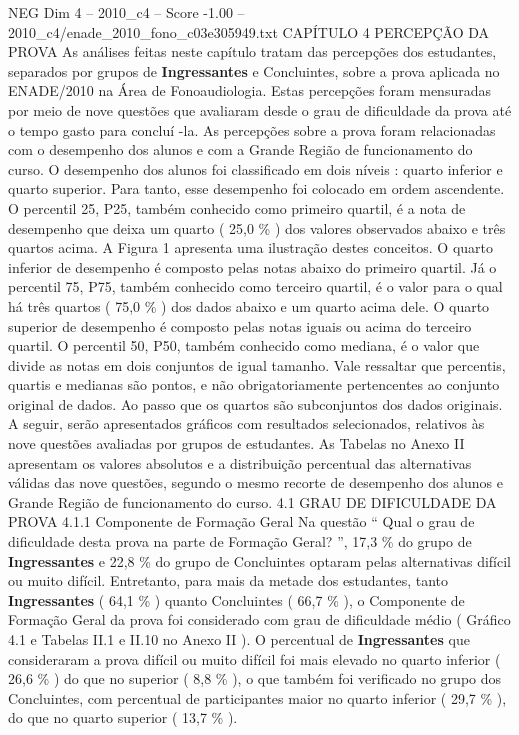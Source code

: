 \begin{textsample}{NEG Dim 4 – 2010\_c4 – Score -1.00 – 2010\_c4/enade\_2010\_fono\_c03e305949.txt}  \label{ex:f4_neg_068}
CAPÍTULO 4 PERCEPÇÃO DA PROVA As análises feitas neste capítulo tratam das percepções dos estudantes, separados por grupos de \textbf{Ingressantes} e Concluintes, sobre a prova aplicada no ENADE/2010 na Área de Fonoaudiologia.
Estas percepções foram mensuradas por meio de nove questões que avaliaram desde o grau de dificuldade da prova até o tempo gasto para concluí -la.
As percepções sobre a prova foram relacionadas com o desempenho dos alunos e com a Grande Região de funcionamento do curso.
O desempenho dos alunos foi classificado em dois níveis : quarto inferior e quarto superior.
Para tanto, esse desempenho foi colocado em ordem ascendente.
O percentil 25, P25, também conhecido como primeiro quartil, é a nota de desempenho que deixa um quarto ( 25,0 \% ) dos valores observados abaixo e três quartos acima.
A Figura 1 apresenta uma ilustração destes conceitos.
O quarto inferior de desempenho é composto pelas notas abaixo do primeiro quartil.
Já o percentil 75, P75, também conhecido como terceiro quartil, é o valor para o qual há três quartos ( 75,0 \% ) dos dados abaixo e um quarto acima dele.
O quarto superior de desempenho é composto pelas notas iguais ou acima do terceiro quartil.
O percentil 50, P50, também conhecido como mediana, é o valor que divide as notas em dois conjuntos de igual tamanho.
Vale ressaltar que percentis, quartis e medianas são pontos, e não obrigatoriamente pertencentes ao conjunto original de dados.
Ao passo que os quartos são subconjuntos dos dados originais.
A seguir, serão apresentados gráficos com resultados selecionados, relativos às nove questões avaliadas por grupos de estudantes.
As Tabelas no Anexo II apresentam os valores absolutos e a distribuição percentual das alternativas válidas das nove questões, segundo o mesmo recorte de desempenho dos alunos e Grande Região de funcionamento do curso. 4.1 GRAU DE DIFICULDADE DA PROVA 4.1.1 Componente de Formação Geral Na questão “ Qual o grau de dificuldade desta prova na parte de Formação Geral? ”, 17,3 \% do grupo de \textbf{Ingressantes} e 22,8 \% do grupo de Concluintes optaram pelas alternativas difícil ou muito difícil.
Entretanto, para mais da metade dos estudantes, tanto \textbf{Ingressantes} ( 64,1 \% ) quanto Concluintes ( 66,7 \% ), o Componente de Formação Geral da prova foi considerado com grau de dificuldade médio ( Gráfico 4.1 e Tabelas II.1 e II.10 no Anexo II ).
O percentual de \textbf{Ingressantes} que consideraram a prova difícil ou muito difícil foi mais elevado no quarto inferior ( 26,6 \% ) do que no superior ( 8,8 \% ), o que também foi verificado no grupo dos Concluintes, com percentual de participantes maior no quarto inferior ( 29,7 \% ), do que no quarto superior ( 13,7 \% ).

\end{textsample}
